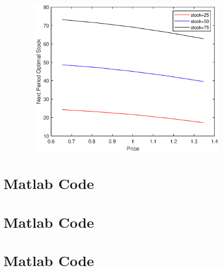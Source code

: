 \documentclass[a4paper,12pt]{article}
\begin{document}
\begin{figure}[h]
\centering
\includegraphics[width=16cm,height=8cm,keepaspectratio]{Pr6_figure2.eps}
\end{figure}








\newpage
\section*{Matlab Code} 
\newpage
\section*{Matlab Code} 
\newpage
\section*{Matlab Code} 
\end{document}
